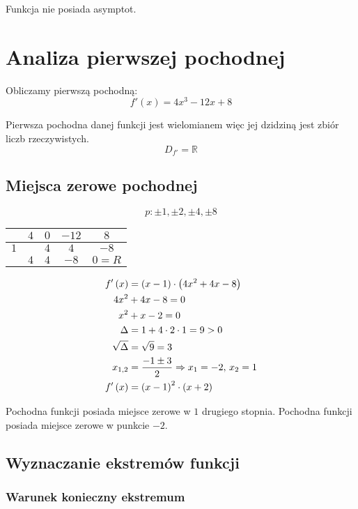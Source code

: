 \documentclass[a4paper,12pt]{article}
\newcommand{\podx}{
		\ensuremath f' \left( x \right)
	}
\begin{document}
Funkcja nie posiada asymptot. 

\section{Analiza pierwszej pochodnej}
Obliczamy pierwszą pochodną:
\[ f' \left( x \right) = 4x^3 - 12x + 8 \]

Pierwsza pochodna danej funkcji jest wielomianem więc jej dzidziną jest zbiór liczb rzeczywistych.
\[ D_{f'} = \mathbb{R} \]

\subsection{Miejsca zerowe pochodnej}
\[ p: \pm 1, \pm 2, \pm 4, \pm 8\]
\begin{center}
	\begin{tabular}{l|c|c|c|c}		
		& $4$	& $0$	& $-12$	& $8$	\\ \hline
	$1$	&	& $4$	& $4$	& $-8$	\\ \hline
		& $4$	& $4$	& $-8$	& $0 = R$\\ 
	\end{tabular}
\end{center}
\begin{align*}
	\podx &= \left( x - 1 \right) \cdot \left( 4x^2 + 4x - 8 \right) \\
	4x^2 &+ 4x - 8 = 0 \\
	x^2 &+ x - 2 = 0 \\
	\Delta &= 1 + 4 \cdot 2 \cdot 1 = 9 > 0\\
	\sqrt{\Delta} &= \sqrt{9} = 3\\
	x_{1, 2} &= \frac{-1 \pm 3}{2} \Rightarrow x_1 = -2, \, x_2 = 1\\
	\podx &= \left( x - 1 \right)^2 \cdot \left( x + 2 \right)
\end{align*}

Pochodna funkcji posiada miejsce zerowe w $1$ drugiego stopnia. Pochodna funkcji posiada miejsce zerowe w punkcie $-2$. 

\subsection{Wyznaczanie ekstremów funkcji}
\subsubsection*{Warunek konieczny ekstremum}
\end{document}
